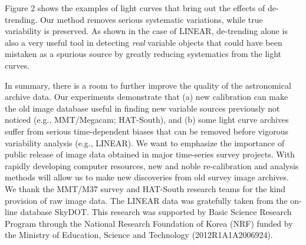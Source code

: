 \documentclass[11pt,twoside]{article}
\begin{document}
\noindent Figure 2 shows the examples of light curves that bring out the effects of de-trending.  Our method removes serious systematic variations, while true variability is preserved.  As shown in the case of LINEAR, de-trending alone is also a very useful tool in detecting {\itshape real} variable objects that could have been mistaken as a spurious source by greatly reducing systematics from the light curves.

In summary, there is a room to further improve the quality of the astronomical archive data.  Our experiments demonstrate that (a) new calibration can make the old image database useful in finding new variable sources previously not noticed (e.g., MMT/Megacam; HAT-South), and (b) some light curve archives suffer from serious time-dependent biases that can be removed before vigorous variability analysis (e.g., LINEAR).  We want to emphasize the importance of public release of image data obtained in major time-series survey projects.  With rapidly developing computer resources, new and noble re-calibration and analysis methods will allow us to make new discoveries from old survey image archives.  \\

\acknowledgements We thank the MMT/M37 survey and HAT-South research teams for the kind provision of raw image data.  The LINEAR data was gratefully taken from the on-line database SkyDOT.  This research was supported by Basic Science Research Program through the National Research Foundation of Korea (NRF) funded by the Ministry of Education, Science and Technology (2012R1A1A2006924).


\end{document}
